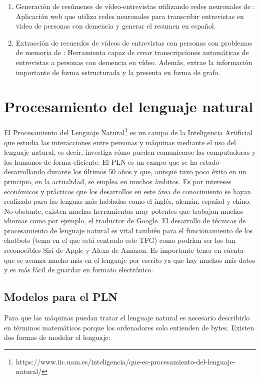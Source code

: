 \begin{enumerate}
	\item Generación de resúmenes de vídeo-entrevistas utilizando redes neuronales de \cite{dalcazar}: Aplicación web que utiliza redes neuronales para transcribir entrevistas en vídeo de personas con demencia y generar el resumen en español.
	\item Extracción de recuerdos de vídeos de entrevistas con personas con problemas de memoria de \cite{hgarcia}: Herramienta capaz de crear transcripciones automáticas de entrevistas a personas con demencia en vídeo. Además, extrae la información importante de forma estructurada y la presenta en forma de grafo. 
\end{enumerate}

\section{Procesamiento del lenguaje natural}

El Procesamiento del Lenguaje Natural\footnote{https://www.iic.uam.es/inteligencia/que-es-procesamiento-del-lenguaje-natural/} es un campo de la Inteligencia Artificial que estudia las interacciones entre personas y máquinas mediante el uso del lenguaje natural, es decir, investiga cómo pueden comunicarse las computadoras y los humanos de forma eficiente. El PLN es un campo que se ha estado desarrollando durante los últimos 50 años y que, aunque tuvo poco éxito en un principio, en la actualidad, se emplea en muchos ámbitos. Es por intereses económicos y prácticos que los desarrollos en este área de conocimiento se hayan realizado para las lenguas más habladas como el inglés, alemán, español y chino. No obstante, existen muchas herramientas muy potentes que trabajan muchos idiomas como por ejemplo, el traductor de Google. El desarrollo de técnicas de procesamiento de lenguaje natural es vital también para el funcionamiento de los chatbots (tema en el que está centrado este TFG) como podrían ser los tan reconocibles Siri de Apple y Alexa de Amazon. Es importante tener en cuenta que se avanza mucho más en el lenguaje por escrito ya que hay muchos más datos y es más fácil de guardar en formato electrónico.


\subsection{Modelos para el PLN}

Para que las máquinas puedan tratar el lenguaje natural es necesario describirlo en términos matemáticos porque los ordenadores solo entienden de bytes. Existen dos formas de modelar el lenguaje:

